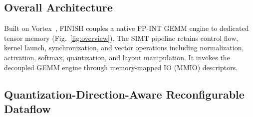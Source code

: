 \documentclass[sigconf,anonymous,nonacm]{acmart}
\newcommand{\ours}{\textsc{FINISH}}
\newcommand{\fpint}{FP-INT}
\newcommand{\wkv}{WKV}
\newcommand{\qcol}{Q-COL}
\newcommand{\qrow}{Q-ROW}
\begin{document}
\subsection{Overall Architecture}
Built on Vortex~\cite{tine2021vortex}, \ours{} couples a native \fpint{} GEMM engine to dedicated tensor memory (Fig.~\ref{fig:overview}). The SIMT pipeline retains control flow, kernel launch, synchronization, and vector operations including normalization, activation, softmax, quantization, and layout manipulation. It invokes the decoupled GEMM engine through memory-mapped IO (MMIO) descriptors.


\subsection{Quantization-Direction-Aware Reconfigurable Dataflow}
\end{document}
